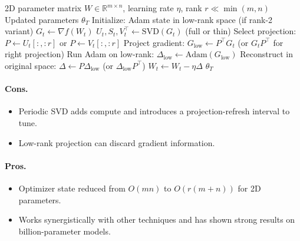 \begin{algorithm}[H]
\caption{GaLore (Gradient Low-Rank Projection)}
\label{alg:galore}
\begin{algorithmic}[1]
\Require 2D parameter matrix $W \in \mathbb{R}^{m \times n}$, learning rate $\eta$, rank $r \ll \min(m,n)$
\Ensure Updated parameters $\theta_T$
\State Initialize: Adam state in low-rank space (if rank-2 variant)
    \State $G_t \gets \nabla f(W_t)$
      
        \State $U_t, S_t, V_t^\top \gets \text{SVD}(G_t)$ (full or thin)
        \State Select projection: $P \gets U_t[:, :r]$ or $P \gets V_t[:, :r]$
    \EndIf
    \State Project gradient: $G_{\text{low}} \gets P^\top G_t$ (or $G_t P^\top$ for right projection)
    \State Run Adam on low-rank: $\Delta_{\text{low}} \gets \text{Adam}(G_{\text{low}})$
    \State Reconstruct in original space: $\Delta \gets P \Delta_{\text{low}}$ (or $\Delta_{\text{low}} P^\top$)
    \State $W_t \gets W_t - \eta \Delta$
\EndFor
\Return $\theta_T$
\end{algorithmic}
\end{algorithm}

\paragraph{Cons.}
\begin{itemize}[leftmargin=*]
\item Periodic SVD adds compute and introduces a projection-refresh interval to tune.
\item Low-rank projection can discard gradient information.
\end{itemize}

\paragraph{Pros.}
\begin{itemize}[leftmargin=*]
\item Optimizer state reduced from $O(mn)$ to $O(r(m+n))$ for 2D parameters.
\item Works synergistically with other techniques and has shown strong results on billion-parameter models.
\end{itemize}

